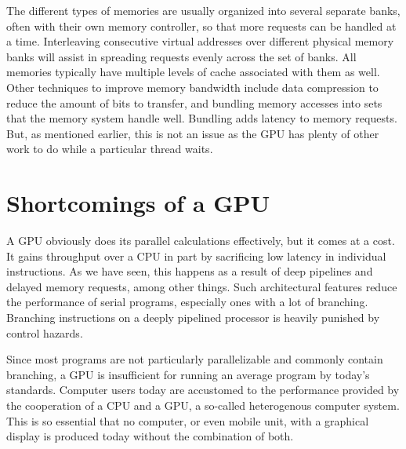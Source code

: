 \documentclass[../main/report.tex]{subfiles}
\begin{document}
The different types of memories are usually organized into several separate banks, often with their own memory controller, so that more requests can be handled at a time.
Interleaving consecutive virtual addresses over different physical memory banks will assist in spreading requests evenly across the set of banks. 
All memories typically have multiple levels of cache associated with them as well.
Other techniques to improve memory bandwidth include data compression to reduce the amount of bits to transfer, and bundling memory accesses into sets that the memory system handle well.
Bundling adds latency to memory requests.
But, as mentioned earlier, this is not an issue as the GPU has plenty of other work to do while a particular thread waits.

\section{Shortcomings of a GPU}


A GPU obviously does its parallel calculations effectively, but it comes at a cost.
It gains throughput over a CPU in part by sacrificing low latency in individual instructions.
As we have seen, this happens as a result of deep pipelines and delayed memory requests, among other things.
Such architectural features reduce the performance of serial programs, especially ones with a lot of branching.
Branching instructions on a deeply pipelined processor is heavily punished by control hazards.

Since most programs are not particularly parallelizable and commonly contain branching, a GPU is insufficient for running an average program by today's standards.
Computer users today are accustomed to the performance provided by the cooperation of a CPU and a GPU, a so-called heterogenous computer system.
This is so essential that no computer, or even mobile unit, with a graphical display is produced today without the combination of both.
\end{document}
